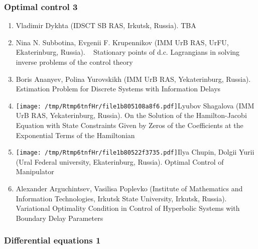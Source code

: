 \documentclass[
]{article}
\providecommand{\tightlist}{%
  \setlength{\itemsep}{0pt}\setlength{\parskip}{0pt}}
\begin{document}
\hypertarget{oc3}{%
\subsubsection{Optimal control 3}\label{oc3}}

\begin{enumerate}
\def\labelenumi{\arabic{enumi}.}
\tightlist
\item
  Vladimir Dykhta (IDSCT SB RAS, Irkutsk, Russia). TBA
\item
  Nina N. Subbotina, Evgenii F. Krupennikov (IMM UrB RAS, UrFU,
  Ekaterinburg, Russia). ~ Stationary points of d.c. Lagrangians in
  solving inverse problems of the control theory
\item
  Boris Ananyev, Polina Yurovskikh (IMM UrB RAS, Yekaterinburg, Russia).
  Estimation Problem for Discrete Systems with Information Delays
\item
  \protect\texttt{[image: /tmp/Rtmp6tnfHr/file1b805108a8f6.pdf]}Lyubov
  Shagalova (IMM UrB RAS, Yekaterinburg, Russia). On the Solution of the
  Hamilton-Jacobi Equation with State Constraints Given by Zeros of the
  Coefficients at the Exponential Terms of the Hamiltonian
\item
  \protect\texttt{[image: /tmp/Rtmp6tnfHr/file1b80522f3735.pdf]}Ilya
  Chupin, Dolgii Yurii (Ural Federal university, Ekaterinburg, Russia).
  Optimal Control of Manipulator
\item
  Alexander Arguchintsev, Vasilisa Poplevko (Institute of Mathematics
  and Information Technologies, Irkutsk State University, Irkutsk,
  Russia). Variational Optimality Condition in Control of Hyperbolic
  Systems with Boundary Delay Parameters
\end{enumerate}

\hypertarget{de1}{%
\subsubsection{Differential equations 1}\label{de1}}
\end{document}
